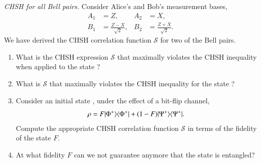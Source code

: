 \begin{exercise}
\emph{CHSH for all Bell pairs.} Consider Alice's and Bob's measurement bases,
\begin{align*}
    A_1 & = Z, & A_2 & = X, \\
    B_1 & = \frac{Z - X}{\sqrt{2}}, & B_2 & = \frac{Z + X}{\sqrt{2}}.
\end{align*}
We have derived the CHSH correlation function $\mathcal{S}$ for two of the Bell pairs.
\begin{enumerate}[label=(\alph*)]
    \item What is the CHSH expression $\mathcal{S}$ that maximally violates the CHSH inequality when applied to the state \ket{\Phi^-}?
    \item What is $\mathcal{S}$ that maximally violates the CHSH inequality for the state \ket{\Psi^-}?
    \item Consider an initial state \ket{\Phi^+}, under the effect of a bit-flip channel,
    \begin{equation}
        \rho = F |\Phi^+ \rangle \langle \Phi^+| + (1-F)|\Psi^+ \rangle \langle \Psi^+|.
    \end{equation}
    Compute the appropriate CHSH correlation function $\mathcal{S}$ in terms of the fidelity of the state $F$.
    \item At what fidelity $F$ can we not guarantee anymore that the state is entangled?
\end{enumerate}
\end{exercise}
